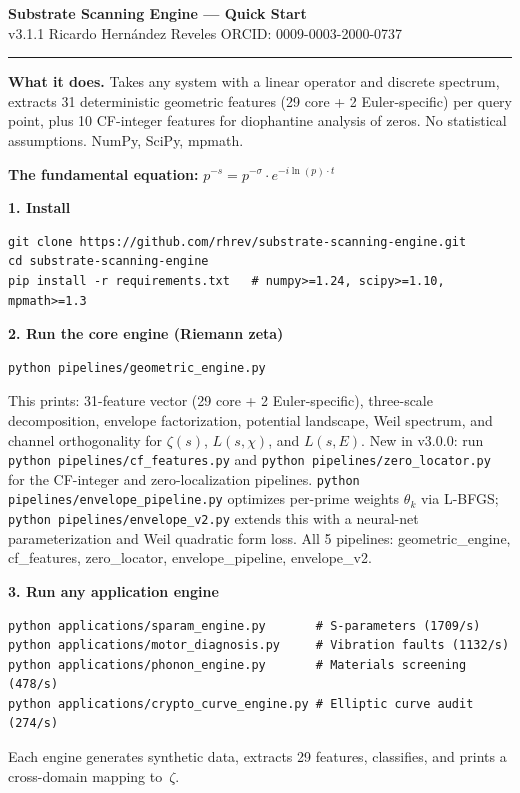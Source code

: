 \documentclass[10pt]{article}
\begin{document}
\begin{center}
{\Large\bfseries Substrate Scanning Engine --- Quick Start}\\[4pt]
{\small v3.1.1 \quad Ricardo Hern\'andez Reveles \quad ORCID: 0009-0003-2000-0737}
\end{center}

\vspace{6pt}
\hrule
\vspace{8pt}

\noindent\textbf{What it does.}\quad
Takes any system with a linear operator and discrete spectrum, extracts
31 deterministic geometric features (29 core + 2 Euler-specific) per query point,
plus 10 CF-integer features for diophantine analysis of zeros. No statistical
assumptions. NumPy, SciPy, mpmath.

\vspace{4pt}
\noindent\textbf{The fundamental equation:}\quad
$p^{-s} = p^{-\sigma}\cdot e^{-i\ln(p)\cdot t}$

\vspace{6pt}
\noindent\textbf{1. Install}
\begin{Verbatim}[fontsize=\small, frame=single]
git clone https://github.com/rhrev/substrate-scanning-engine.git
cd substrate-scanning-engine
pip install -r requirements.txt   # numpy>=1.24, scipy>=1.10, mpmath>=1.3
\end{Verbatim}

\vspace{4pt}
\noindent\textbf{2. Run the core engine (Riemann zeta)}
\begin{Verbatim}[fontsize=\small, frame=single]
python pipelines/geometric_engine.py
\end{Verbatim}
This prints: 31-feature vector (29 core + 2 Euler-specific), three-scale decomposition, envelope
factorization, potential landscape, Weil spectrum, and channel orthogonality
for $\zeta(s)$, $L(s,\chi)$, and $L(s,E)$.  New in v3.0.0: run
\verb|python pipelines/cf_features.py| and \verb|python pipelines/zero_locator.py|
for the CF-integer and zero-localization pipelines.
\verb|python pipelines/envelope_pipeline.py| optimizes per-prime weights
$\theta_k$ via L-BFGS; \verb|python pipelines/envelope_v2.py| extends this
with a neural-net parameterization and Weil quadratic form loss.
All 5 pipelines: geometric\_engine, cf\_features, zero\_locator,
envelope\_pipeline, envelope\_v2.

\vspace{4pt}
\noindent\textbf{3. Run any application engine}
\begin{Verbatim}[fontsize=\small, frame=single]
python applications/sparam_engine.py       # S-parameters (1709/s)
python applications/motor_diagnosis.py     # Vibration faults (1132/s)
python applications/phonon_engine.py       # Materials screening (478/s)
python applications/crypto_curve_engine.py # Elliptic curve audit (274/s)
\end{Verbatim}
Each engine generates synthetic data, extracts 29 features, classifies,
and prints a cross-domain mapping to~$\zeta$.
\end{document}
